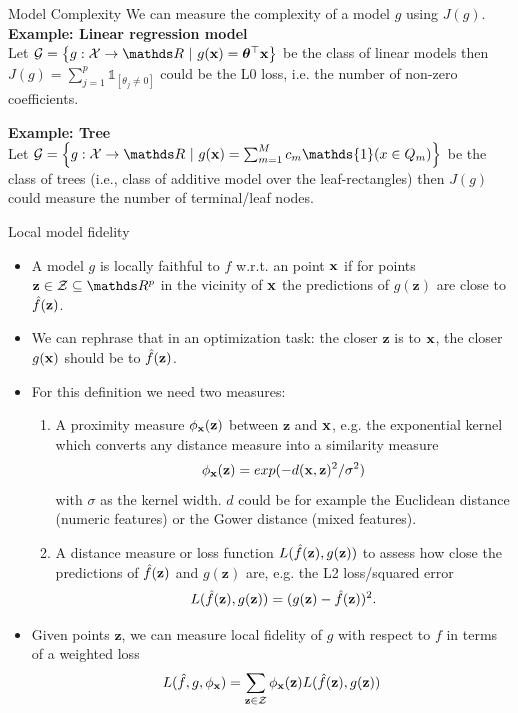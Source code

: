 \documentclass[11pt,compress,t,notes=noshow, xcolor=table]{beamer}
\newcommand{\Gspace}{\mathcal{G}}
\newcommand{\neigh}{\phi_{\xv}}
\newcommand{\zv}{\mathbf{z}}
\newcommand{\Zspace}{\mathcal{Z}}
\newcommand{\Ind}{\mathds{1}}
\begin{document}
\begin{vbframe}{Model Complexity}
We can measure the complexity of a model $g$ using $J(g)$. \\ 
\vspace{0.5cm}
 	\textbf{Example: Linear regression model}\\
 	Let $\Gspace = \left\{g: \Xspace \to \R ~|~g(\xv) = \thetab^\top \xv\right\}$ be the class of linear models then $J(g) = \sum_{j = 1}^p \Ind_{[\theta_j \neq 0]}$ could be the L0 loss, i.e. the number of non-zero coefficients. 
 	\vspace{0.5cm}
 	
 	\textbf{Example: Tree}\\
 	Let $\Gspace = \left\{g:\Xspace \to \R ~|~g(\xv) = \sum_{m=1}^M c_m \Ind(x \in Q_m)\right\}$ be the class of trees (i.e., class of additive model over the leaf-rectangles) then $J(g)$ could measure the number of terminal/leaf nodes.\\
 	\end{vbframe}
 
 	\begin{vbframe}{Local model fidelity}
 		\begin{itemize}
 			\item A model $g$ is locally faithful to $f$ w.r.t. an point $\xv$ if for points $\zv \in \Zspace \subseteq \R^p$ in the vicinity of $\xv$ the predictions of $g(\zv)$ are close to $\fh(\zv)$. 
 			 \item We can rephrase that in an optimization task: the closer $\zv$ is to $\xv$, the closer $g(\xv)$ should be to $\fh(\zv)$.  
 			\item For this definition we need two measures:
 			\begin{enumerate}
 				\item A proximity measure $\neigh(\zv)$ between $\zv$ and $\xv$, e.g. the exponential kernel which converts any distance measure into a similarity measure 
 				$$\neigh(\zv) = exp(-d(\xv, \zv)^2/\sigma^2)$$ 
 				with $\sigma$ as the kernel width. $d$ could be for example the Euclidean distance (numeric features) or the Gower distance (mixed features). 
 				\item A distance measure or loss function $L(\fh(\zv), g(\zv))$ to assess how close the predictions of $\fh(\zv)$ and $g(\zv)$ are, e.g. the L2 loss/squared error $$L(\fh(\zv), g(\zv)) = (g(\zv) - \fh(\zv))^2.$$ 
 			\end{enumerate}
 			\item Given points $\zv$, we can measure local fidelity of $g$ with respect to $f$ in terms of a weighted loss
 			\begin{equation}
 				L(\fh, g, \neigh) = \sum_{\zv \in \Zspace} \neigh(\zv) L(\fh(\zv), g(\zv))
 				\label{eq:optim}
 			\end{equation}
 			
 		\end{itemize}
\end{vbframe}
\end{document}
